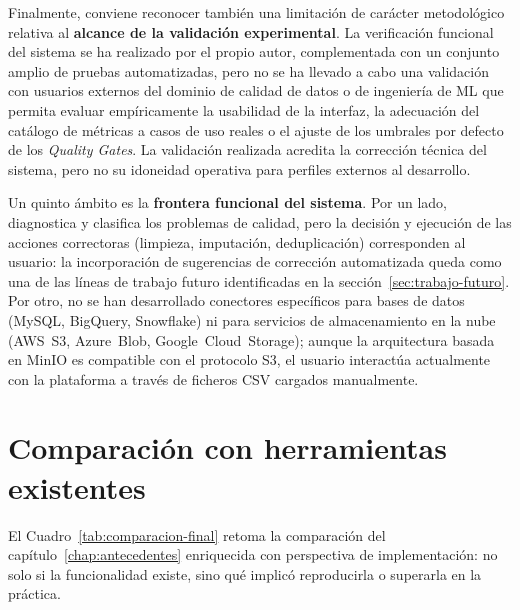 Finalmente, conviene reconocer también una limitación de carácter
metodológico relativa al \textbf{alcance de la validación
experimental}.  La verificación funcional del sistema se ha realizado
por el propio autor, complementada con un conjunto amplio de pruebas
automatizadas, pero no se ha llevado a cabo una validación con usuarios
externos del dominio de calidad de datos o de ingeniería de \ac{ML} que
permita evaluar empíricamente la usabilidad de la interfaz, la
adecuación del catálogo de métricas a casos de uso reales o el ajuste
de los umbrales por defecto de los \emph{Quality Gates}.  La
validación realizada acredita la corrección técnica del sistema, pero
no su idoneidad operativa para perfiles externos al desarrollo.

Un quinto ámbito es la \textbf{frontera funcional del sistema}.  Por un
lado, \dataqual diagnostica y clasifica los problemas de calidad, pero la
decisión y ejecución de las acciones correctoras (limpieza, imputación,
deduplicación) corresponden al usuario: la incorporación de sugerencias
de corrección automatizada queda como una de las líneas de trabajo
futuro identificadas en la sección~\ref{sec:trabajo-futuro}.  Por otro,
no se han desarrollado conectores específicos para bases de datos
(MySQL, BigQuery, Snowflake) ni para servicios de almacenamiento en la
nube (\ac{AWS}~S3, Azure~Blob, Google~Cloud~Storage); aunque la arquitectura
basada en MinIO es compatible con el protocolo S3, el usuario interactúa
actualmente con la plataforma a través de ficheros \ac{CSV} cargados
manualmente.


\section{Comparación con herramientas existentes}
\label{sec:comparacion-final}

El Cuadro~\ref{tab:comparacion-final} retoma la comparación del
capítulo~\ref{chap:antecedentes} enriquecida con perspectiva de
implementación: no solo si la funcionalidad existe, sino qué implicó
reproducirla o superarla en la práctica.

